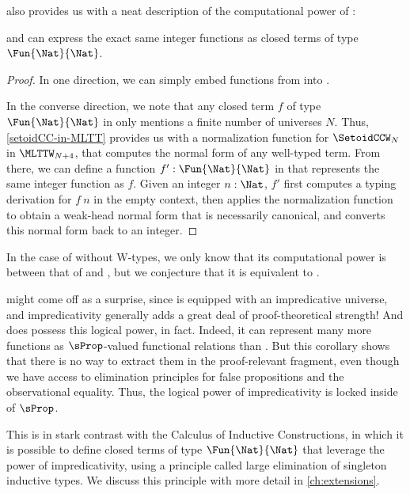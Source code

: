  also provides us with a neat description of the
computational power of \SetoidCCW:

\begin{corollary}\label{integer-functions}
  \SetoidCCW and \MLTTW can express the exact same integer functions
  as closed terms of type \( \Fun{\Nat}{\Nat} \).
\end{corollary}

\begin{proof}
  In one direction, we can simply embed functions from \MLTTW into \SetoidCCW.

  In the converse direction, we note that any closed term \( f \) of
  type \( \Fun{\Nat}{\Nat} \) in \SetoidCCW only mentions a finite number of
  universes \( N \).
  Thus, \cref{setoidCC-in-MLTT} provides us with a normalization function for 
  \( \SetoidCCW_N \) in \( \MLTTW_{N+4} \), that computes the normal form of any 
  well-typed term. 
  From there, we can define a function \( f' : \Fun{\Nat}{\Nat} \) in \MLTTW
  that represents the same integer function as \( f \).
  Given an integer \( n : \Nat \), \( f' \) first computes a \SetoidCCW typing 
  derivation for \( f\ n \) in the empty context, then applies the 
  normalization function to obtain a weak-head normal form that is necessarily
  canonical, and converts this normal form back to an integer.
\end{proof}
%
In the case of \SetoidCC without \( \mathrm{W} \)-types, we only know that its
computational power is between that of \MLTT and \MLTTW, but we conjecture that
it is equivalent to \MLTT.

 might come off as a surprise, since \SetoidCC is 
equipped with an impredicative universe, and impredicativity generally adds
a great deal of proof-theoretical strength!
%
And \SetoidCC does possess this logical power, in fact. Indeed, it can
represent many more functions as \( \sProp \)-valued functional relations
than \MLTT. But this corollary shows that there is no way to extract them
in the proof-relevant fragment, even though we have access to elimination
principles for false propositions and the observational equality.
%
Thus, the logical power of impredicativity is locked inside of \( \sProp \).

This is in stark contrast with the Calculus of Inductive Constructions,
in which it is possible to define closed terms of type \( \Fun{\Nat}{\Nat} \) that leverage
the power of impredicativity, using a principle called large elimination
of singleton inductive types.
%
We discuss this principle with more detail in \cref{ch:extensions}.

